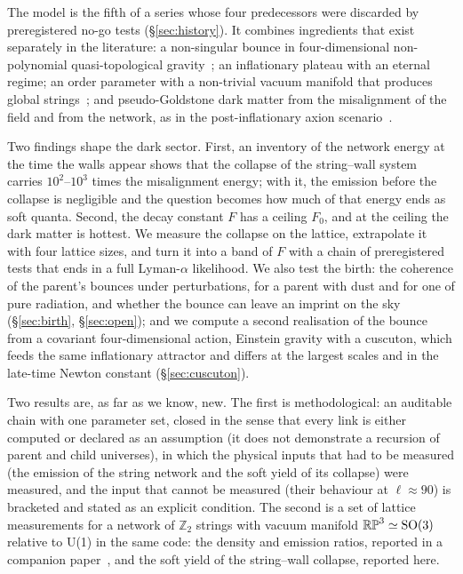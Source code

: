 \documentclass[11pt,a4paper]{article}
\newcommand{\RP}{\mathbb{RP}^3}
\newcommand{\Ztwo}{\mathbb{Z}_2}
\begin{document}
The model is the fifth of a series whose four predecessors were discarded by preregistered no-go tests (\S\ref{sec:history}).
It combines ingredients that exist separately in the literature: a non-singular bounce in four-dimensional non-polynomial quasi-topological gravity~\cite{Bueno2025formation,BorissovaMagueijo2026}; an inflationary plateau with an eternal regime; an order parameter with a non-trivial vacuum manifold that produces global strings~\cite{Kibble1976,VilenkinShellard}; and pseudo-Goldstone dark matter from the misalignment of the field and from the network, as in the post-inflationary axion scenario~\cite{GHV2018,GHV2021,Buschmann2022,Hindmarsh2021approach,Saikawa2024,KimParkSon2024,Correia2025spectrum}.

Two findings shape the dark sector.
First, an inventory of the network energy at the time the walls appear shows that the collapse of the string--wall system carries $10^2$--$10^3$ times the misalignment energy; with it, the emission before the collapse is negligible and the question becomes how much of that energy ends as soft quanta.
Second, the decay constant $F$ has a ceiling $F_0$, and at the ceiling the dark matter is hottest.
We measure the collapse on the lattice, extrapolate it with four lattice sizes, and turn it into a band of $F$ with a chain of preregistered tests that ends in a full Lyman-$\alpha$ likelihood.
We also test the birth: the coherence of the parent's bounces under perturbations, for a parent with dust and for one of pure radiation, and whether the bounce can leave an imprint on the sky (\S\ref{sec:birth}, \S\ref{sec:open}); and we compute a second realisation of the bounce from a covariant four-dimensional action, Einstein gravity with a cuscuton, which feeds the same inflationary attractor and differs at the largest scales and in the late-time Newton constant (\S\ref{sec:cuscuton}).

Two results are, as far as we know, new.
The first is methodological: an auditable chain with one parameter set, closed in the sense that every link is either computed or declared as an assumption (it does not demonstrate a recursion of parent and child universes), in which the physical inputs that had to be measured (the emission of the string network and the soft yield of its collapse) were measured, and the input that cannot be measured (their behaviour at $\ell\approx90$) is bracketed and stated as an explicit condition.
The second is a set of lattice measurements for a network of $\Ztwo$ strings with vacuum manifold $\RP\simeq{\rm SO}(3)$ relative to U(1) in the same code: the density and emission ratios, reported in a companion paper~\cite{rp3_paper}, and the soft yield of the string--wall collapse, reported here.
\end{document}
